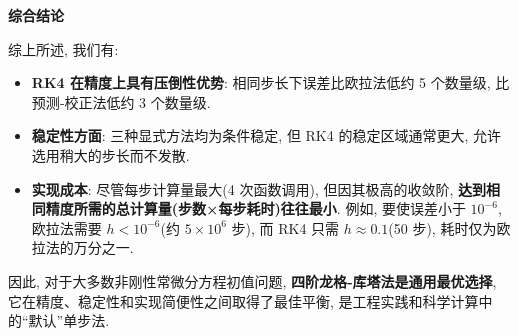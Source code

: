 \documentclass[zihao=-4,a4paper]{ctexart}
\begin{document}
\noindent\textbf{综合结论}

综上所述, 我们有: 
\begin{itemize}[rightmargin=0.5cm]
    \item \textbf{RK4 在精度上具有压倒性优势}: 相同步长下误差比欧拉法低约 5 个数量级, 比预测‑校正法低约 3 个数量级. 
    \item \textbf{稳定性方面}: 三种显式方法均为条件稳定, 但 RK4 的稳定区域通常更大, 允许选用稍大的步长而不发散. 
    \item \textbf{实现成本}: 尽管每步计算量最大(4 次函数调用), 但因其极高的收敛阶, \textbf{达到相同精度所需的总计算量(步数×每步耗时)往往最小}. 例如, 要使误差小于 $10^{-6}$, 欧拉法需要 $h<10^{-6}$(约 $5\times10^6$ 步), 而 RK4 只需 $h\approx0.1$(50 步), 耗时仅为欧拉法的万分之一. 
\end{itemize}

\noindent 因此, 对于大多数非刚性常微分方程初值问题, \textbf{四阶龙格‑库塔法是通用最优选择}, 它在精度、稳定性和实现简便性之间取得了最佳平衡, 是工程实践和科学计算中的“默认”单步法. 
\end{document}
